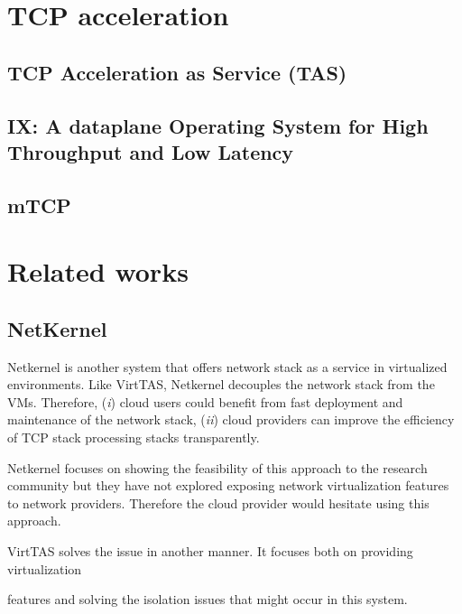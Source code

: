 \section{TCP acceleration}

\subsection{TCP Acceleration as Service (TAS)}


\subsection{IX: A dataplane Operating System for High Throughput and Low Latency}


\subsection{mTCP}


\section{Related works}
\subsection{NetKernel}
Netkernel is another system that offers network stack as a service in virtualized 
environments. Like VirtTAS, Netkernel decouples the network stack from the VMs. Therefore, 
(\emph{i}) cloud users could benefit from fast deployment and maintenance of the network 
stack, (\emph{ii}) cloud providers can improve the efficiency of TCP stack processing stacks 
transparently. 

Netkernel focuses on showing the feasibility of this approach to the research community but 
they have not explored exposing network virtualization features to network providers. 
Therefore the cloud provider would hesitate using this approach. %

VirtTAS solves the issue in another manner. It focuses both on providing virtualization 

features and solving the isolation issues that might occur in this system. %